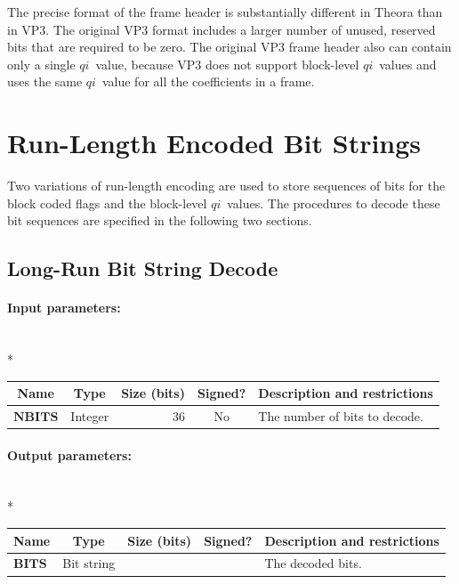 \documentclass[9pt,letterpaper]{book}
\newcommand{\idx}[1]{{\ensuremath{\mathit{#1}}}}
\newcommand{\qi}{\idx{qi}}
\newcommand{\bitvar}[1]{\ensuremath{\mathbf{\bm{#1}}}}
\numberwithin{equation}{chapter}
\numberwithin{figure}{chapter}
\numberwithin{table}{chapter}
\begin{document}
The precise format of the frame header is substantially different in Theora
 than in VP3.
The original VP3 format includes a larger number of unused, reserved bits that
 are required to be zero.
The original VP3 frame header also can contain only a single \qi\ value,
 because VP3 does not support block-level \qi\ values and uses the same
 \qi\ value for all the coefficients in a frame.

\section{Run-Length Encoded Bit Strings}

Two variations of run-length encoding are used to store sequences of bits for
 the block coded flags and the block-level \qi\ values.
The procedures to decode these bit sequences are specified in the following two
 sections.

\subsection{Long-Run Bit String Decode}
\label{sub:long-run}

\paragraph{Input parameters:}\hfill\\*
\begin{tabularx}{\textwidth}{@{}llrcX@{}}\toprule
\multicolumn{1}{c}{Name} &
\multicolumn{1}{c}{Type} &
\multicolumn{1}{p{30pt}}{\centering Size (bits)} &
\multicolumn{1}{c}{Signed?} &
\multicolumn{1}{c}{Description and restrictions} \\\midrule\endhead
\bitvar{NBITS}   & Integer & 36 & No & The number of bits to decode. \\
\bottomrule\end{tabularx}

\paragraph{Output parameters:}\hfill\\*
\begin{tabularx}{\textwidth}{@{}llrcX@{}}\toprule
\multicolumn{1}{c}{Name} &
\multicolumn{1}{c}{Type} &
\multicolumn{1}{p{30pt}}{\centering Size (bits)} &
\multicolumn{1}{c}{Signed?} &
\multicolumn{1}{c}{Description and restrictions} \\\midrule\endhead
\bitvar{BITS}    & Bit string &    &    & The decoded bits. \\
\bottomrule\end{tabularx}
\end{document}
